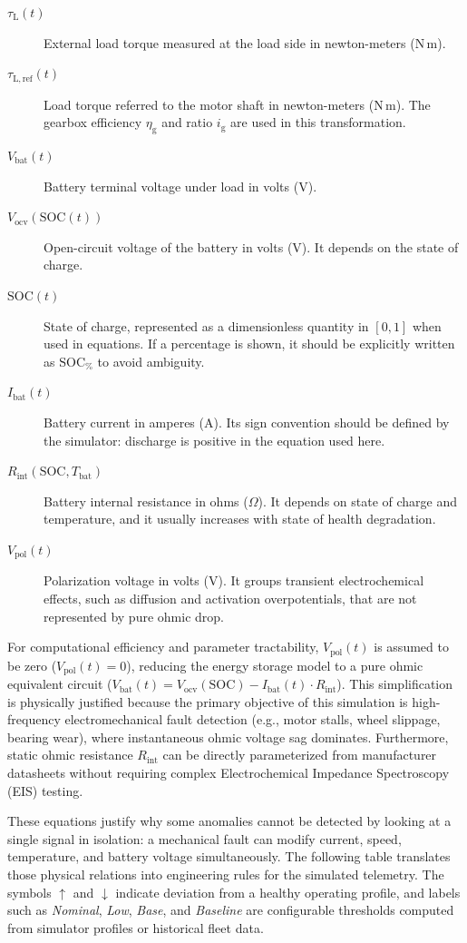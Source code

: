 \begin{description}
    \item[$\tau_{\mathrm{L}}(t)$] External load torque measured at the load side in newton-meters ($\mathrm{N}\,\mathrm{m}$).
    \item[$\tau_{\mathrm{L,ref}}(t)$] Load torque referred to the motor shaft in newton-meters ($\mathrm{N}\,\mathrm{m}$). The gearbox efficiency $\eta_{\mathrm{g}}$ and ratio $i_{\mathrm{g}}$ are used in this transformation.
    \item[$V_{\mathrm{bat}}(t)$] Battery terminal voltage under load in volts ($\mathrm{V}$).
    \item[$V_{\mathrm{ocv}}(\mathrm{SOC}(t))$] Open-circuit voltage of the battery in volts ($\mathrm{V}$). It depends on the state of charge.
    \item[$\mathrm{SOC}(t)$] State of charge, represented as a dimensionless quantity in $[0,1]$ when used in equations. If a percentage is shown, it should be explicitly written as $\mathrm{SOC}_{\%}$ to avoid ambiguity.
    \item[$I_{\mathrm{bat}}(t)$] Battery current in amperes ($\mathrm{A}$). Its sign convention should be defined by the simulator: discharge is positive in the equation used here.
    \item[$R_{\mathrm{int}}(\mathrm{SOC},T_{\mathrm{bat}})$] Battery internal resistance in ohms ($\Omega$). It depends on state of charge and temperature, and it usually increases with state of health degradation.
    \item[$V_{\mathrm{pol}}(t)$] Polarization voltage in volts ($\mathrm{V}$). It groups transient electrochemical effects, such as diffusion and activation overpotentials, that are not represented by pure ohmic drop.
\end{description}
For computational efficiency and parameter tractability, $V_{\mathrm{pol}}(t)$ is assumed to be zero ($V_{\mathrm{pol}}(t) = 0$), reducing the energy storage model to a pure ohmic equivalent circuit ($V_{\mathrm{bat}}(t) = V_{\mathrm{ocv}}(\mathrm{SOC}) - I_{\mathrm{bat}}(t) \cdot R_{\mathrm{int}}$). This simplification is physically justified because the primary objective of this simulation is high-frequency electromechanical fault detection (e.g., motor stalls, wheel slippage, bearing wear), where instantaneous ohmic voltage sag dominates. Furthermore, static ohmic resistance $R_{\mathrm{int}}$ can be directly parameterized from manufacturer datasheets without requiring complex Electrochemical Impedance Spectroscopy (EIS) testing.


These equations justify why some anomalies cannot be detected by looking at a single signal in isolation: a mechanical fault can modify current, speed, temperature, and battery voltage simultaneously. The following table translates those physical relations into engineering rules for the simulated telemetry. The symbols $\uparrow$ and $\downarrow$ indicate deviation from a healthy operating profile, and labels such as \textit{Nominal}, \textit{Low}, \textit{Base}, and \textit{Baseline} are configurable thresholds computed from simulator profiles or historical fleet data.

